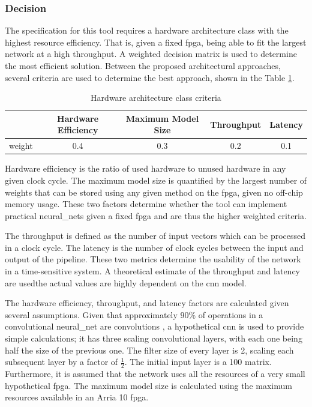\documentclass{uw-ece-wkrpt}
\begin{document}
\subsubsection{Decision}\label{sec:decision}

The specification for this tool requires a hardware architecture class with the highest resource efficiency. That is, given a fixed \gls{fpga}, being able to fit the largest network at a high throughput. A weighted decision matrix is used to determine the most efficient solution. Between the proposed architectural approaches, several criteria are used to determine the best approach, shown in the Table \ref{tab:hw_arch_criteria}.

\begin{table}[b]
\centering
\caption{Hardware architecture class criteria}\label{tab:hw_arch_criteria}
\begin{tabular}{lcccc}
\toprule
       & Hardware Efficiency & Maximum Model Size & Throughput & Latency \\
\midrule
\Gls{weight} & 0.4 & 0.3 & 0.2 & 0.1 \\
\bottomrule
\end{tabular}
\end{table}

 Hardware efficiency is the ratio of used hardware to unused hardware in any given clock cycle. The maximum model size is quantified by the largest number of weights that can be stored using any given method on the \gls{fpga}, given no off-chip memory usage. These two factors determine whether the tool can implement practical \glspl{neural_net} given a fixed \gls{fpga} and are thus the higher weighted criteria.

The throughput is defined as the number of input vectors which can be processed in a clock cycle. The latency is the number of clock cycles between the input and output of the pipeline. These two metrics determine the usability of the network in a time-sensitive system. A theoretical estimate of the throughput and latency are used\textemdash{}the actual values are highly dependent on the \gls{cnn} model.

The hardware efficiency, throughput, and latency factors are calculated given several assumptions. Given that approximately 90\% of operations in a convolutional \gls{neural_net} are convolutions \cite{Cong2014Minimizing-Comp}, a hypothetical \gls{cnn} is used to provide simple calculations; it has three scaling convolutional layers, with each one being half the size of the previous one. The \gls{filter} size of every layer is 2, scaling each subsequent layer by a factor of $\frac{1}{2}$. The initial input layer is a 100 matrix. Furthermore, it is assumed that the network uses all the resources of a very small hypothetical \gls{fpga}. The maximum model size is calculated using the maximum resources available in an Arria 10 \gls{fpga}.
\end{document}
